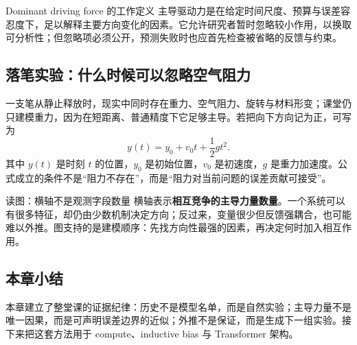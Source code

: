 
\begin{importantbox}{Dominant driving force 的工作定义}
主导驱动力是在给定时间尺度、预算与误差容忍度下，足以解释主要方向变化的因素。它允许研究者暂时忽略较小作用，以换取可分析性；但忽略项必须公开，预测失败时也应首先检查被省略的反馈与约束。
\end{importantbox}


\subsection{落笔实验：什么时候可以忽略空气阻力}

一支笔从静止释放时，现实中同时存在重力、空气阻力、旋转与材料形变；课堂仍只建模重力，因为在短距离、普通精度下它足够主导。若把向下方向记为正，可写为
\[
y(t)=y_0+v_0t+\frac{1}{2}gt^2.
\]
其中 $y(t)$ 是时刻 $t$ 的位置，$y_0$ 是初始位置，$v_0$ 是初速度，$g$ 是重力加速度。公式成立的条件不是“阻力不存在”，而是“阻力对当前问题的误差贡献可接受”。



\begin{knowledgebox}{读图：横轴不是观测字段数量}
横轴表示\textbf{相互竞争的主导力量数量}。一个系统可以有很多特征，却仍由少数机制决定方向；反过来，变量很少但反馈强耦合，也可能难以外推。图支持的是建模顺序：先找方向性最强的因素，再决定何时加入相互作用。
\end{knowledgebox}


\subsection{本章小结}

本章建立了整堂课的证据纪律：历史不是模型名单，而是自然实验；主导力量不是唯一因果，而是可声明误差边界的近似；外推不是保证，而是生成下一组实验。接下来把这套方法用于 compute、inductive bias 与 Transformer 架构。

